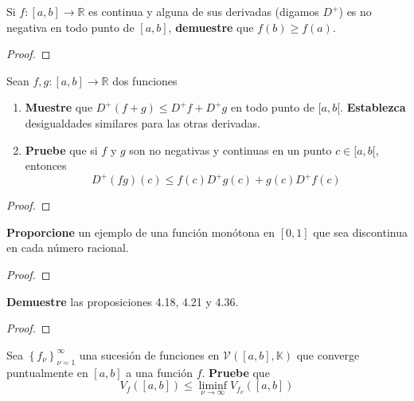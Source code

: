 \documentclass[12pt]{report}
\theoremstyle{largebreak}
\newcommand\cf[3]{\ensuremath{#1:#2\rightarrow#3}}
\begin{document}
    \begin{excer}
        Si $\cf{f}{[a,b]}{\mathbb{R}}$ es continua y alguna de sus derivadas (digamos $D^+$) es no negativa en todo punto de $[a,b]$, \textbf{demuestre} que $f(b)\geq f(a)$.
    \end{excer}

    \begin{proof}
        
    \end{proof}

    \begin{excer}
        Sean $\cf{f,g}{[a,b]}{\mathbb{R}}$ dos funciones
        \begin{enumerate}
            \item \textbf{Muestre} que $D^+(f+g)\leq D^+f+D^+g$ en todo punto de $[a,b[$. \textbf{Establezca} desigualdades similares para las otras derivadas.
            \item \textbf{Pruebe} que si $f$ y $g$ son no negativas y continuas en un punto $c\in[a,b[$, entonces
            \begin{equation*}
                D^+(fg)(c)\leq f(c)D^+g(c)+g(c)D^+f(c)
            \end{equation*}
        \end{enumerate}
    \end{excer}

    \begin{proof}
        
    \end{proof}

    \begin{excer}
        \textbf{Proporcione} un ejemplo de una función monótona en $[0,1]$ que sea discontinua en cada número racional.
    \end{excer}

    \begin{proof}
        
    \end{proof}

    \begin{excer}
        \textbf{Demuestre} las proposiciones 4.18, 4.21 y 4.36.
    \end{excer}

    \begin{proof}
        
    \end{proof}

    \begin{excer}
        Sea $\left\{f_\nu\right\}_{\nu=1}^{\infty}$ una sucesión de funciones en $\mathscr{V}([a,b],\mathbb{K})$ que converge puntualmente en $[a,b]$ a una función $f$. \textbf{Pruebe} que
        \begin{equation*}
            V_f([a,b])\leq \liminf_{\nu\rightarrow\infty}V_{f_\nu}([a,b])
        \end{equation*}
    \end{excer}
\end{document}
